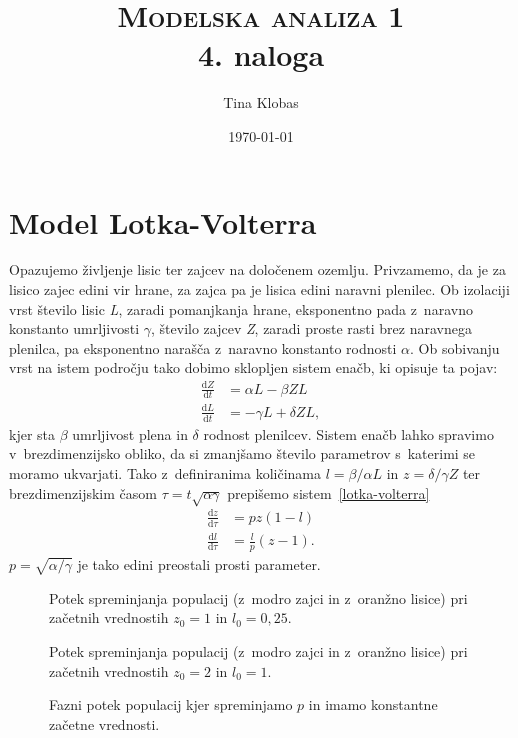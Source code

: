 \documentclass[a4paper,pdftex,10pt]{article}
\title{	
\normalfont \normalsize 
\textsc{Modelska analiza 1} \\ [25pt] %
\huge 4. naloga\\ %
}
\author{Tina Klobas} %
\date{\normalsize\today} %
\numberwithin{equation}{section} %
\numberwithin{figure}{section} %
\numberwithin{table}{section} %
\begin{document}
\maketitle %


\section{Model Lotka-Volterra}
Opazujemo življenje lisic ter zajcev na določenem ozemlju. Privzamemo, da je za lisico 
zajec edini vir hrane, za zajca pa je lisica edini naravni plenilec. Ob izolaciji vrst 
število lisic \emph{L}, zaradi pomanjkanja hrane, eksponentno pada z~naravno 
konstanto umrljivosti $\gamma$, število zajcev \emph{Z}, zaradi proste rasti brez 
naravnega plenilca, pa eksponentno narašča z~naravno konstanto rodnosti $\alpha$. Ob 
sobivanju vrst na istem področju tako dobimo sklopljen sistem enačb, ki opisuje ta pojav:
\begin{align}\label{lotka-volterra}
    \frac{\mathrm{d}Z}{\mathrm{d}t} &= \alpha L - \beta Z L \\
    \frac{\mathrm{d}L}{\mathrm{d}t} &= -\gamma L + \delta Z L,
\end{align}
kjer sta $\beta$ umrljivost plena in $\delta$ rodnost plenilcev. Sistem enačb lahko spravimo
v~brezdimenzijsko obliko, da si zmanjšamo število parametrov s~katerimi se moramo ukvarjati.
Tako z~definiranima količinama $l=\beta/\alpha L$ in $z=\delta/\gamma Z$ ter 
brezdimenzijskim časom $\tau = t\sqrt{\alpha \gamma}$ prepišemo sistem~\ref{lotka-volterra}
\begin{align}\label{LV}
    \frac{\mathrm{d}z}{\mathrm{d}\tau} &= p z (1-l) \\
    \frac{\mathrm{d}l}{\mathrm{d}\tau} &= \frac{l}{p} (z-1).
\end{align}
$p = \sqrt{\alpha/\gamma}$ je tako edini preostali prosti parameter. 

\begin{figure}    
    \centering
    \resizebox{0.8\linewidth}{!}{}
    \caption{Potek spreminjanja populacij (z~modro zajci in z~oranžno lisice) pri začetnih 
    vrednostih $z_0=1$ in $l_0=0,25$.}
    \label{slika1}
\end{figure}
\begin{figure}    
    \centering
    \resizebox{0.8\linewidth}{!}{}
    \caption{Potek spreminjanja populacij (z~modro zajci in z~oranžno lisice) pri začetnih
    vrednostih $z_0=2$ in $l_0=1$.}
    \label{slika2}
\end{figure}
\begin{figure}    
    \centering
    \resizebox{0.8\linewidth}{!}{}
    \caption{Fazni potek populacij kjer spreminjamo $p$ in imamo konstantne začetne 
    vrednosti.}
    \label{slika3}
\end{figure}
\end{document}
